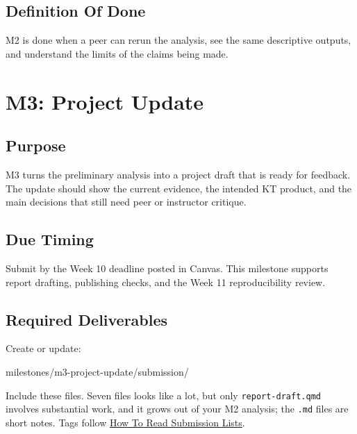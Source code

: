 \documentclass[
  letterpaper,
  DIV=11,
  numbers=noendperiod,
  oneside]{scrreprt}
\newenvironment{Shaded}{\begin{snugshade}}{\end{snugshade}}
\newcommand{\NormalTok}[1]{\textcolor[rgb]{0.00,0.23,0.31}{#1}}
\begin{document}
\section{Definition Of Done}\label{definition-of-done-23}

M2 is done when a peer can rerun the analysis, see the same descriptive
outputs, and understand the limits of the claims being made.

\chapter{M3: Project Update}\label{m3-project-update}

\section{Purpose}\label{purpose-16}

M3 turns the preliminary analysis into a project draft that is ready for
feedback. The update should show the current evidence, the intended KT
product, and the main decisions that still need peer or instructor
critique.

\section{Due Timing}\label{due-timing-3}

Submit by the Week 10 deadline posted in Canvas. This milestone supports
report drafting, publishing checks, and the Week 11 reproducibility
review.

\section{Required Deliverables}\label{required-deliverables-3}

Create or update:

\begin{Shaded}
\begin{Highlighting}[numbers=left,,]
\NormalTok{milestones/m3{-}project{-}update/submission/}
\end{Highlighting}
\end{Shaded}

Include these files. Seven files looks like a lot, but only
\texttt{report-draft.qmd} involves substantial work, and it grows out of
your M2 analysis; the \texttt{.md} files are short notes. Tags follow
\hyperref[how-to-read-submission-lists]{How To Read Submission Lists}.
\end{document}
